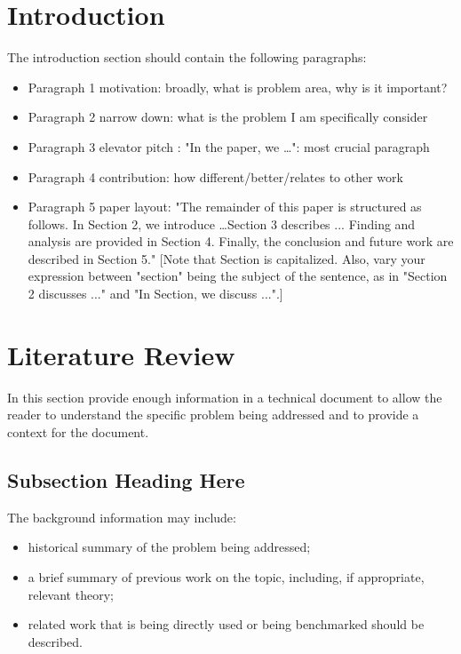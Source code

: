 \documentclass[conference,letterpaper]{IEEEtran}
\begin{document}
\section{Introduction}
The introduction section should contain the following paragraphs:
    \begin{itemize}
        \item Paragraph 1 motivation: broadly, what is problem area, why is it important?

        \item Paragraph 2 narrow down: what is the problem I am specifically consider

        \item Paragraph 3 elevator pitch : "In the paper, we \dots": most crucial paragraph

        \item Paragraph 4 contribution: how different/better/relates to other work

        \item Paragraph 5 paper layout: "The remainder of this paper is structured as follows. In Section 2, we introduce \dots Section 3 describes ... Finding and analysis are provided in Section 4. Finally, the conclusion and future work are described in Section 5." [Note that Section is capitalized. Also, vary your expression between "section" being the subject of the sentence, as in "Section 2 discusses ..." and "In Section, we discuss ...".]
    \end{itemize}
%



\section{Literature Review}
In this section provide enough information in a technical document to allow the reader to understand the specific problem being addressed and to provide a context for the document.
\subsection{Subsection Heading Here}
The background information may include:
    \begin{itemize}
	   \item historical summary of the problem being addressed;
	   \item a brief summary of previous work on the topic, including, if appropriate, relevant theory;
       \item related work that is being directly used or being benchmarked should be described.
    \end{itemize}
\end{document}
